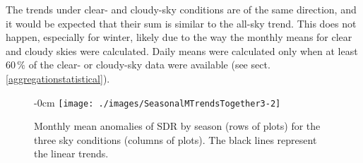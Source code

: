 \documentclass[applsci,article,submit,moreauthors,pdftex]{Definitions/mdpi}
\begin{document}
The trends under clear- and cloudy-sky conditions are of the same
direction, and it would be expected that their sum is similar to the
all-sky trend. This does not happen, especially for winter, likely due
to the way the monthly means for clear and cloudy skies were calculated.
Daily means were calculated only when at least \(60\,\%\) of the clear-
or cloudy-sky data were available (see sect.
\ref{aggregationstatistical}).

\begin{figure}[h!]
    \begin{adjustwidth}{-\extralength}{0cm}
        {\centering 
            \texttt{[image: ./images/SeasonalMTrendsTogether3-2]}   %
        }
        \caption{Monthly mean anomalies of SDR by season (rows of plots) for the three sky conditions (columns of plots). The black lines represent the linear trends.}\label{fig:seasonalALL}
    \end{adjustwidth}
\end{figure}
\end{document}
